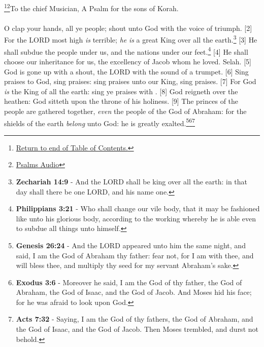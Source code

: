 \footnote{\textcolor[cmyk]{0.99998,1,0,0}{\hyperlink{TOC}{Return to end of Table of Contents.}}}\footnote{\href{https://audiobible.com/bible/psalms_47.html}{\textcolor[cmyk]{0.99998,1,0,0}{Psalms Audio}}}\textcolor[cmyk]{0.99998,1,0,0}{To the chief Musician, A Psalm for the sons of Korah.}\\
\\
\textcolor[cmyk]{0.99998,1,0,0}{O clap your hands, all ye people; shout unto God with the voice of triumph.}
[2] \textcolor[cmyk]{0.99998,1,0,0}{For the LORD most high \emph{is} terrible; \emph{he} \emph{is} a great King over all the earth.}\footnote{\textbf{Zechariah 14:9}  - And the LORD shall be king over all the earth: in that day shall there be one LORD, and his name one.}
[3] \textcolor[cmyk]{0.99998,1,0,0}{He shall subdue the people under us, and the nations under our feet.}\footnote{\textbf{Philippians 3:21} - Who shall change our vile body, that it may be fashioned like unto his glorious body, according to the working whereby he is able even to subdue all things unto himself.}
[4] \textcolor[cmyk]{0.99998,1,0,0}{He shall choose our inheritance for us, the excellency of Jacob whom he loved. Selah.}
[5] \textcolor[cmyk]{0.99998,1,0,0}{God is gone up with a shout, the LORD with the sound of a trumpet.}
[6] \textcolor[cmyk]{0.99998,1,0,0}{Sing praises to God, sing praises: sing praises unto our King, sing praises.}
[7] \textcolor[cmyk]{0.99998,1,0,0}{For God \emph{is} the King of all the earth: sing ye praises with .}
[8] \textcolor[cmyk]{0.99998,1,0,0}{God reigneth over the heathen: God sitteth upon the throne of his holiness.}
[9] \textcolor[cmyk]{0.99998,1,0,0}{The princes of the people are gathered together, \emph{even} the people of the God of Abraham: for the shields of the earth \emph{belong} unto God: he is greatly exalted.}\footnote{\textbf{Genesis 26:24} - And the LORD appeared unto him the same night, and said, I am the God of Abraham thy father: fear not, for I am with thee, and will bless thee, and multiply thy seed for my servant Abraham’s sake.}\footnote{\textbf{Exodus 3:6} - Moreover he said, I am the God of thy father, the God of Abraham, the God of Isaac, and the God of Jacob. And Moses hid his face; for he was afraid to look upon God.}\footnote{\textbf{Acts 7:32} - Saying, I am the God of thy fathers, the God of Abraham, and the God of Isaac, and the God of Jacob. Then Moses trembled, and durst not behold.}